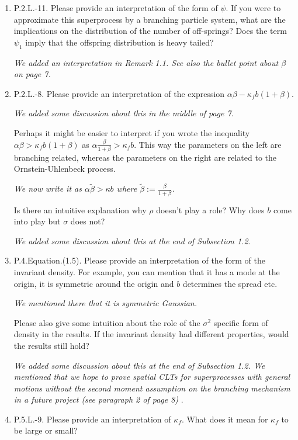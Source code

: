 \documentclass[12pt,a4paper]{amsart}
\begin{document}
\begin{enumerate}
\item
  P.2.L.-11.
  Please provide an interpretation of the form of $\psi$.
  If you were to approximate this superprocess by a branching particle system, what are the implications on the distribution of the number of off-springs?
  Does the term $\psi_1$ imply that the offspring distribution is heavy tailed?

  \emph{We added an interpretation in Remark 1.1.
   See also the bullet point about $\beta$ on page 7.
    }
\item
  P.2.L.-8.
  Please provide an interpretation of the expression $\alpha\beta - \kappa_f b(1+\beta)$.

\emph{We added some discussion about this in the middle of page 7.}

  Perhaps it might be easier to interpret if you wrote the inequality $\alpha \beta > \kappa_f b(1 + \beta)$ as $\alpha \frac{\beta}{1+\beta} > \kappa_f b$.
  This way the parameters on the left are branching related, whereas the parameters on the right are related to the Ornstein-Uhlenbeck process.

  \emph{We now write it as $\alpha \tilde \beta > \kappa b$ where $\tilde \beta := \frac{\beta}{1+\beta}$.}

  Is there an intuitive explanation why $\rho$ doesn't play a role?
  Why does $b$ come into play but $\sigma$ does not?

  \emph{We added some discussion about this at the end of Subsection 1.2}.
\item
  P.4.Equation.(1.5).
  Please provide an interpretation of the form of the invariant density.
  For example, you can mention that it has a mode at the origin, it is symmetric around the origin and $b$ determines the spread etc.

\emph{We mentioned there that it is symmetric Gaussian.}

  Please also give some intuition about the role of the $\sigma^2$ specific form of density in the results.
  If the invariant density had different properties, would the results still hold?

  \emph{We added some discussion about this at the end of Subsection 1.2.
We mentioned that we hope to prove spatial CLTs for superprocesses with general motions without the second moment assumption
on the branching mechanism in a future project (see paragraph 2 of page 8)
}.
\item
  P.5.L.-9.
  Please provide an interpretation of $\kappa_f$.
  What does it mean for $\kappa_f$ to be large or small?


\end{enumerate}
\end{document}
